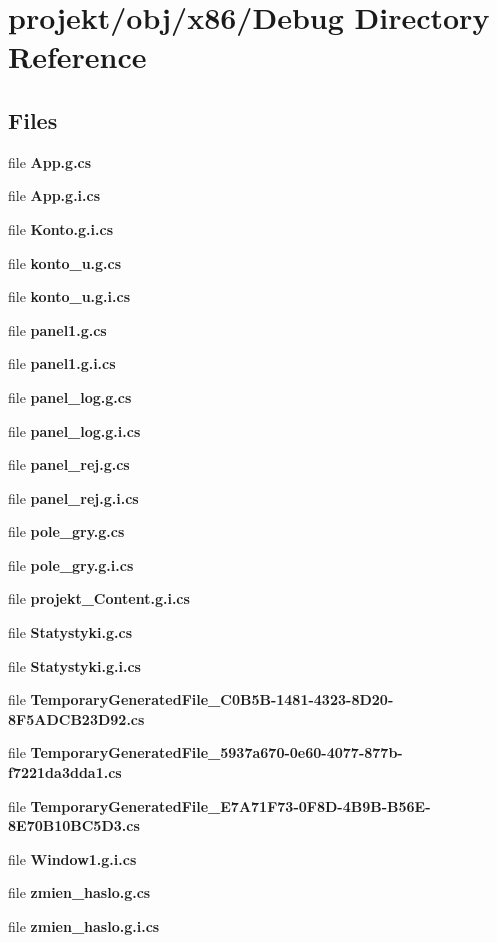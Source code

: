 \section{projekt/obj/x86/\+Debug Directory Reference}
\label{dir_078894b216cc9df695bdfbc80141608f}
\subsection*{Files}
\begin{DoxyCompactItemize}
\item 
file \textbf{ App.\+g.\+cs}
\item 
file \textbf{ App.\+g.\+i.\+cs}
\item 
file \textbf{ Konto.\+g.\+i.\+cs}
\item 
file \textbf{ konto\+\_\+u.\+g.\+cs}
\item 
file \textbf{ konto\+\_\+u.\+g.\+i.\+cs}
\item 
file \textbf{ panel1.\+g.\+cs}
\item 
file \textbf{ panel1.\+g.\+i.\+cs}
\item 
file \textbf{ panel\+\_\+log.\+g.\+cs}
\item 
file \textbf{ panel\+\_\+log.\+g.\+i.\+cs}
\item 
file \textbf{ panel\+\_\+rej.\+g.\+cs}
\item 
file \textbf{ panel\+\_\+rej.\+g.\+i.\+cs}
\item 
file \textbf{ pole\+\_\+gry.\+g.\+cs}
\item 
file \textbf{ pole\+\_\+gry.\+g.\+i.\+cs}
\item 
file \textbf{ projekt\+\_\+\+Content.\+g.\+i.\+cs}
\item 
file \textbf{ Statystyki.\+g.\+cs}
\item 
file \textbf{ Statystyki.\+g.\+i.\+cs}
\item 
file \textbf{ Temporary\+Generated\+File\+\_\+C0\+B5\+B-\/1481-\/4323-\/8\+D20-\/8\+F5\+A\+D\+C\+B23\+D92.\+cs}
\item 
file \textbf{ Temporary\+Generated\+File\+\_\+5937a670-\/0e60-\/4077-\/877b-\/f7221da3dda1.\+cs}
\item 
file \textbf{ Temporary\+Generated\+File\+\_\+\+E7\+A71\+F73-\/0\+F8\+D-\/4\+B9\+B-\/\+B56\+E-\/8\+E70\+B10\+B\+C5\+D3.\+cs}
\item 
file \textbf{ Window1.\+g.\+i.\+cs}
\item 
file \textbf{ zmien\+\_\+haslo.\+g.\+cs}
\item 
file \textbf{ zmien\+\_\+haslo.\+g.\+i.\+cs}
\end{DoxyCompactItemize}
